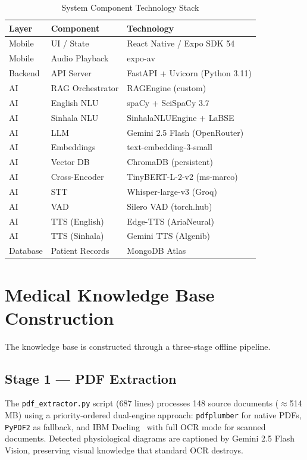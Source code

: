 \documentclass[12pt,a4paper]{report}
\begin{document}
\begin{table}[H]
\centering
\caption{System Component Technology Stack}
\label{tab:stack}
\renewcommand{\arraystretch}{1.3}
\begin{tabularx}{\textwidth}{@{}llX@{}}
\toprule
\textbf{Layer} & \textbf{Component} & \textbf{Technology} \\
\midrule
Mobile   & UI / State        & React Native / Expo SDK 54 \\
Mobile   & Audio Playback    & expo-av \\
Backend  & API Server        & FastAPI + Uvicorn (Python 3.11) \\
AI       & RAG Orchestrator  & RAGEngine (custom) \\
AI       & English NLU       & spaCy + SciSpaCy 3.7 \\
AI       & Sinhala NLU       & SinhalaNLUEngine + LaBSE \\
AI       & LLM               & Gemini 2.5 Flash (OpenRouter) \\
AI       & Embeddings        & text-embedding-3-small \\
AI       & Vector DB         & ChromaDB (persistent) \\
AI       & Cross-Encoder     & TinyBERT-L-2-v2 (ms-marco) \\
AI       & STT               & Whisper-large-v3 (Groq) \\
AI       & VAD               & Silero VAD (torch.hub) \\
AI       & TTS (English)     & Edge-TTS (AriaNeural) \\
AI       & TTS (Sinhala)     & Gemini TTS (Algenib) \\
Database & Patient Records   & MongoDB Atlas \\
\bottomrule
\end{tabularx}
\end{table}

\section{Medical Knowledge Base Construction}

The knowledge base is constructed through a three-stage offline pipeline.

\subsection{Stage 1 — PDF Extraction}

The \texttt{pdf\_extractor.py} script (687 lines) processes 148 source documents ($\approx$514\,MB) using a priority-ordered dual-engine approach: \texttt{pdfplumber} for native PDFs, \texttt{PyPDF2} as fallback, and IBM Docling~\cite{IBMDocling2024} with full OCR mode for scanned documents. Detected physiological diagrams are captioned by Gemini 2.5 Flash Vision, preserving visual knowledge that standard OCR destroys.
\end{document}
